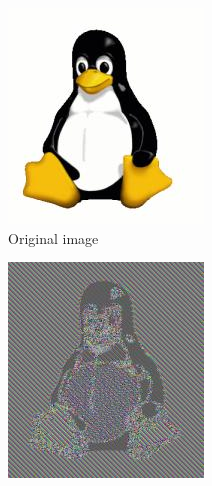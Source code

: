 \begin{figure}[h]
  \centering
  \hfill
  \begin{subfigure}[b]{0.4\textwidth}
    \includegraphics[width=\textwidth]{Figures/Tux.jpg}
    \caption{Original image}
    \label{figures:tux}
  \end{subfigure}
  \hfill
  \begin{subfigure}[b]{0.4\textwidth}
    \includegraphics[width=\textwidth]{Figures/Tux_ecb.jpg}

\end{subfigure}
\end{figure}
